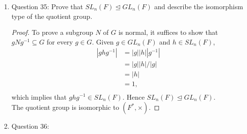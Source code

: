 \documentclass{article}
\begin{document}
\begin{enumerate}
\begin{enumerate}
      \item Question 35: Prove that $SL_n(F)\unlhd GL_n(F)$ and describe
        the isomorphism type of the quotient group.
        \begin{proof}
          To prove a subgroup $N$ of $G$ is normal, it suffices to show
          that $gNg^{-1}\subseteq G$ for every $g\in G$. Given $g\in
          GL_n(F)$ and $h\in SL_n(F)$,
          \begin{align*}
            |ghg^{-1}|  &= |g||h||g^{-1}| \\
                        &= |g||h|/|g|     \\
                        &= |h|            \\
                        &= 1,             \\
          \end{align*}
          which implies that $ghg^{-1}\in SL_n(F)$. Hence $SL_n(F)\unlhd
          GL_n(F)$. \\

          The quotient group is isomorphic to $(F^*,\times)$.
        \end{proof}

      \item Question 36:
    \end{enumerate}
\end{enumerate}
\end{document}
